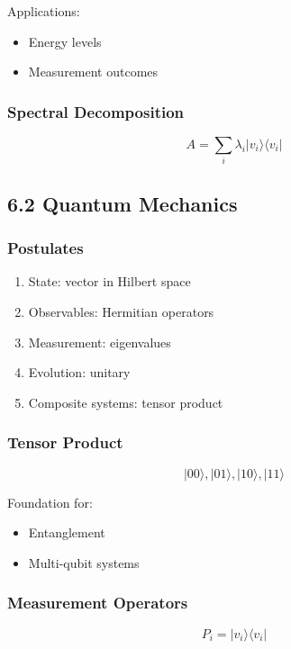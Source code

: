 Applications:
\begin{itemize}
\item Energy levels
\item Measurement outcomes
\end{itemize}

\subsubsection*{Spectral Decomposition}

\[
A = \sum_i \lambda_i |v_i\rangle \langle v_i|
\]

\vspace{0.5cm}

\subsection*{6.2 Quantum Mechanics}

\subsubsection*{Postulates}

\begin{enumerate}
\item State: vector in Hilbert space
\item Observables: Hermitian operators
\item Measurement: eigenvalues
\item Evolution: unitary
\item Composite systems: tensor product
\end{enumerate}

\subsubsection*{Tensor Product}

\[
|00\rangle, |01\rangle, |10\rangle, |11\rangle
\]

Foundation for:
\begin{itemize}
\item Entanglement
\item Multi-qubit systems
\end{itemize}

\subsubsection*{Measurement Operators}

\[
P_i = |v_i\rangle \langle v_i|
\]

